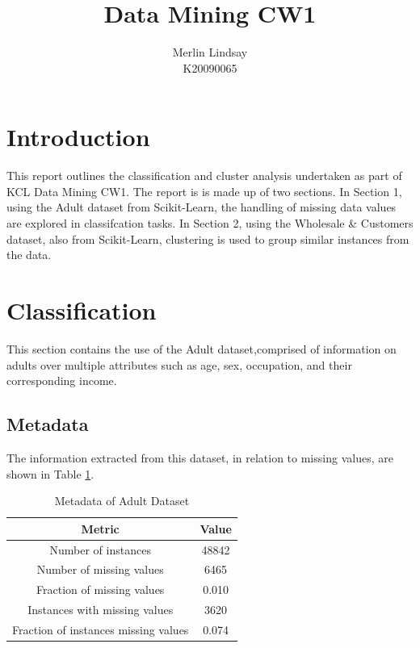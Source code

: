 \documentclass{article}
\title{Data Mining CW1}
\author{Merlin Lindsay\\
        \small  K20090065 
}
\date{}
\begin{document}
\maketitle

\section*{Introduction}

This report outlines the classification and cluster analysis undertaken as part of KCL Data Mining CW1. The report is is made up of
two sections. In Section 1, using the Adult dataset from Scikit-Learn, the handling of missing data values are explored in classifcation tasks. In Section 2,
using the Wholesale \& Customers dataset, also from Scikit-Learn, clustering is used to group similar instances from the data.


\section{Classification}

This section contains the use of the Adult dataset,comprised of information on adults over multiple attributes such as age, 
sex, occupation, and their corresponding income.



\subsection{Metadata}
The information extracted from this dataset, in relation to missing values, are shown in Table \ref{table:metAdult}.
\vspace{2mm}

\begin{table}
        \centering
\begin{tabular}{ |c|c|}
        \hline
        Metric & Value\\
        \hline
        Number of instances & 48842\\
        Number of missing values & 6465\\
        Fraction of missing values & 0.010\\
        Instances with missing values & 3620\\
        Fraction of instances missing values & 0.074\\
        \hline
       \end{tabular}
\caption{Metadata of Adult Dataset}
        \label{table:metAdult}
\end{table}
\end{document}
